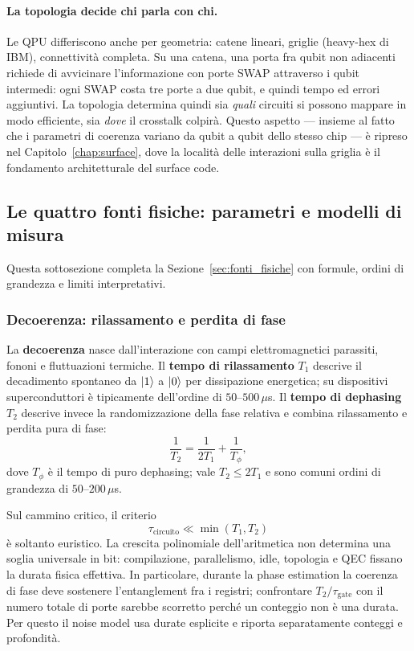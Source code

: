 \paragraph{La topologia decide chi parla con chi.}
Le QPU differiscono anche per geometria: catene lineari, griglie (heavy-hex di IBM), connettività completa. Su una catena, una porta fra qubit non adiacenti richiede di avvicinare l'informazione con porte SWAP attraverso i qubit intermedi: ogni SWAP costa tre porte a due qubit, e quindi tempo ed errori aggiuntivi. La topologia determina quindi sia \emph{quali} circuiti si possono mappare in modo efficiente, sia \emph{dove} il crosstalk colpirà. Questo aspetto --- insieme al fatto che i parametri di coerenza variano da qubit a qubit dello stesso chip --- è ripreso nel Capitolo~\ref{chap:surface}, dove la località delle interazioni sulla griglia è il fondamento architetturale del surface code.

\subsection{Le quattro fonti fisiche: parametri e modelli di misura}
\label{app:fonti_fisiche_estese}

Questa sottosezione completa la Sezione~\ref{sec:fonti_fisiche} con formule,
ordini di grandezza e limiti interpretativi.

\subsubsection{Decoerenza: rilassamento e perdita di fase}

La \textbf{decoerenza} nasce dall'interazione con campi elettromagnetici
parassiti, fononi e fluttuazioni termiche. Il \textbf{tempo di rilassamento}
$T_1$ descrive il decadimento spontaneo da $\ket{1}$ a $\ket{0}$ per
dissipazione energetica; su dispositivi superconduttori è tipicamente
dell'ordine di $50$--$500\,\mu$s. Il \textbf{tempo di dephasing} $T_2$
descrive invece la randomizzazione della fase relativa e combina rilassamento e
perdita pura di fase:
\begin{equation}
    \frac{1}{T_2}=\frac{1}{2T_1}+\frac{1}{T_\phi},
    \label{eq:T2_decomp}
\end{equation}
dove $T_\phi$ è il tempo di puro dephasing; vale $T_2\leq2T_1$ e sono comuni
ordini di grandezza di $50$--$200\,\mu$s.

Sul cammino critico, il criterio
\begin{equation}
    \tau_{\text{circuito}}\ll\min(T_1,T_2)
\end{equation}
è soltanto euristico. La crescita polinomiale dell'aritmetica non determina una
soglia universale in bit: compilazione, parallelismo, idle, topologia e QEC
fissano la durata fisica effettiva. In particolare, durante la phase estimation
la coerenza di fase deve sostenere l'entanglement fra i registri; confrontare
$T_2/\tau_{\text{gate}}$ con il numero totale di porte sarebbe scorretto perché
un conteggio non è una durata. Per questo il noise model usa durate esplicite e
riporta separatamente conteggi e profondità.


